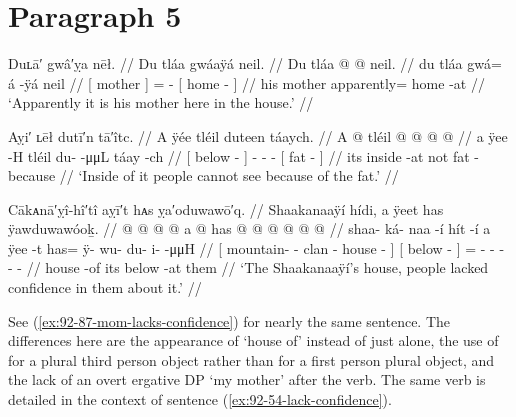 \section{Paragraph 5}\label{sec:92-para-5}

\ex\label{ex:92-112-his-mother-at-home}%
%
\begingl
	\glpreamble	Duʟā′ gwâ′ỵa nēł. //
	\glpreamble	Du tláa gwáaÿá neil. //
	\gla	{} Du tláa {}  @ {} @ {}
		{} neil. {} {} //
	\glb	{} du tláa {} gwá= á -ÿá
		{} neil {} {} //
	\glc	{}[  mother {}] =  -
		{}[ home - {}] //
	\gld	{} his mother {} apparently=  {}
		{} home -at {} //
	\glft	‘Apparently it is his mother here in the house.’
		//
\endgl
\xe

\ex\label{ex:92-113-inside-cant-see-because-fat}%
%
\begingl
	\glpreamble	Aỵi′ ʟēł dutī′n tā′îtc. //
	\glpreamble	A ÿée tléil duteen táaych. //
	\gla	{} A  @ {} {}
		tléil  @ {} @ {} @ {}
		{}  @ {} {} //
	\glb	{} a ÿee -H {}
		tléil {} du-  -μμL
		{} táay -ch {} //
	\glc	{}[  below - {}]
		 - -  -
		{}[ fat - {}] //
	\gld	{} its inside -at {}
		not  {} {} {}
		{} fat -because {} //
	\glft	‘Inside of it people cannot see because of the fat.’
		//
\endgl
\xe

\ex\label{ex:92-114-lacked-confidence}%
%
\begingl
	\glpreamble	Cākᴀnā′ỵî-hî′tî aỵī′t hᴀs ỵa′oduwawō′q. //
	\glpreamble	Shaakanaaÿí hídi, a ÿeet has ÿawduwawóoḵ. //
	\gla	{}  @ {} @ {} @ {}  @ {} {}
		{} a  @ {} {}
		has @  @ {} @ {} @ {} @ {} @ {} //
	\glb	{} shaa- ká- naa -í hít -í {}
		{} a ÿee -t {}
		has= ÿ- wu- du- i-  -μμH  //
	\glc	{}[ mountain- - clan - house - {}]
		{}[  below - {}]
		= - - - -
			 - //
	\gld	{}  {} {} {} house -of {}
		{} its below -at {}
		them  {} {} {} {} {} //
	\glft	‘The Shaakanaaÿí’s house, people lacked confidence in them about it.’
		//
\endgl
\xe

See (\ref{ex:92-87-mom-lacks-confidence}) for nearly the same sentence.
The differences here are the appearance of  ‘house of’ instead of just  alone, the use of  for a plural third person object rather than  for a first person plural object, and the lack of an overt ergative DP  ‘my mother’ after the verb.
The same verb is detailed in the context of sentence (\ref{ex:92-54-lack-confidence}).

